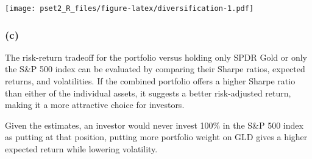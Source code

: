 \documentclass[
]{article}
\begin{document}
\texttt{[image: pset2\_R\_files/figure-latex/diversification-1.pdf]}

\hypertarget{c-1}{%
\subsubsection{(c)}\label{c-1}}

The risk-return tradeoff for the portfolio versus holding only SPDR Gold
or only the S\&P 500 index can be evaluated by comparing their Sharpe
ratios, expected returns, and volatilities. If the combined portfolio
offers a higher Sharpe ratio than either of the individual assets, it
suggests a better risk-adjusted return, making it a more attractive
choice for investors.

Given the estimates, an investor would never invest 100\% in the S\&P
500 index as putting at that position, putting more portfolio weight on
GLD gives a higher expected return while lowering volatility.
\end{document}
